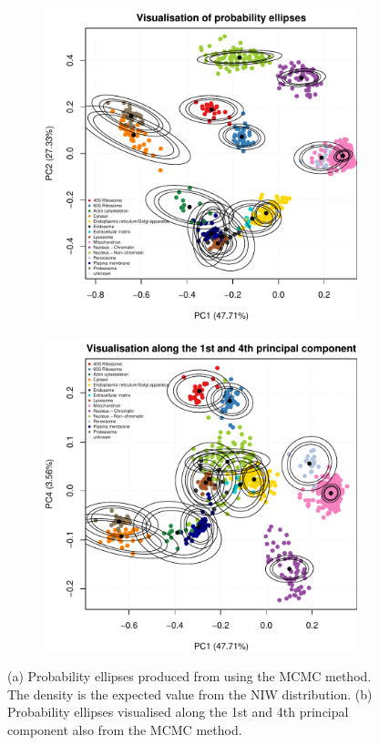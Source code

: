 \documentclass[12pt,english]{article}
\begin{document}
\begin{figure}[ht]
  \begin{subfigure}[t]{0.5\textwidth}
        \centering
\includegraphics{tagm-006}
        \caption{}
\end{subfigure}%
\hfill
\begin{subfigure}[t]{0.5\textwidth}
\includegraphics{tagm-007}
        \centering
        \caption{}
\end{subfigure}
  \centering
  \caption{(a) Probability ellipses produced from using the MCMC method.
    The density is the expected value from the NIW distribution. (b)
    Probability ellipses visualised along the 1st and
    4th principal component also from the MCMC method.}
\label{figure::pcaellipseMCMC}
\end{figure}
\end{document}
